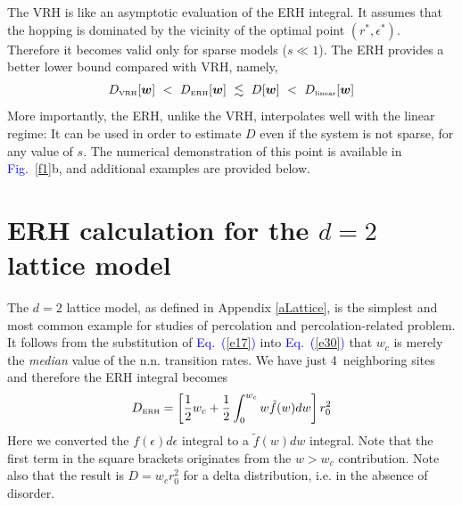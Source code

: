 \documentclass[aps,prb,floats,floatfix,twocolumn]{revtex4}
\newcommand{\eexp}{\mbox{e}^}
\newcommand{\tbox}[1]{\mbox{\tiny #1}}
\newcommand{\mylabel}[1]{\label{#1}}
\newcommand{\beq}{\begin{eqnarray}}
\newcommand{\eeq}{\end{eqnarray}}
\newcommand{\be}[1]{\begin{eqnarray}\ifthenelse{#1=-1}
{\nonumber}{\ifthenelse{#1=0}{}{\mylabel{e#1}}}}
\newcommand{\Eq}[1]{\textcolor{blue}{Eq.\!\!~(\ref{#1})}}
\newcommand{\Fig}[1]{\textcolor{blue}{Fig.}\!\!~\ref{#1}}
\newcommand{\hide}[1]{}
\begin{document}
The VRH is like an asymptotic evaluation of the ERH integral.
It assumes that the hopping is dominated 
by the vicinity of the optimal point ${(r^*,\epsilon^*)}$.
Therefore it becomes valid only for sparse models ($s\ll1$). 
The ERH provides a better lower bound compared with VRH, namely, 
%
\beq
D_{\tbox{VRH}}[\bm{w}]  
\ < \ D_{\tbox{ERH}}[\bm{w}]
\ \lesssim \ D[\bm{w}]
\ < \ D_{\tbox{linear}}[\bm{w}]
\eeq
%
More importantly, the ERH, unlike the VRH, 
interpolates well with the linear regime:  
It can be used in order to estimate $D$ 
even if the system is not sparse, for any value of $s$. 
The numerical demonstration of this point 
is available in \Fig{f1}b, and additional 
examples are provided below.  



\section{ERH calculation for the $d{=}2$ lattice model}

The $d{=}2$ lattice model, as defined in Appendix \ref{aLattice}, 
is the simplest and most common example 
for studies of percolation and percolation-related problem. 
%
It follows from the substitution of \Eq{e17} into \Eq{e30}
that $w_c$ is merely the {\em median} value of the n.n. transition rates. 
We have just 4~neighboring sites and therefore the ERH integral becomes
%
\be{37}
D_{\tbox{ERH}} =  \left[\frac{1}{2}w_c + \frac{1}{2}\int_0^{w_c} w\tilde{f}(w) dw\right]r_0^2
\eeq
% 
Here we converted the $f(\epsilon)d\epsilon$ integral 
to a $\tilde{f}(w)dw$ integral.     
Note that the first term in the square brackets 
originates from the ${w>w_c}$ contribution.
Note also that the result is $D= w_c r_0^2$ for a delta 
distribution, i.e. in the absence of disorder. 


\hide{
We would like to test the validity of \Eq{e37}.
The purpose of this test is twofold: 
(i) to verify that the use of ${n_c=2}$  
indeed leads to a good estimate; 
(ii) to see whether the ERH estimate is indeed 
an improvement over the conventional estimate. 
The conventional estimate is just to use 
the median value leading to $D \approx w_c r_0^2$. 
%
For the purpose of numerical test we consider 
a uniform distribution of $\epsilon$ 
within ${[-\sigma,\sigma]}$. From \Eq{e37} we get 
%
\beq
D_{\tbox{ERH}} =  \left[\frac{1}{2} + \frac{1}{2\sigma}\left(1-\eexp{-\sigma}\right)\right] 
\, w_c \, r_0^2
\eeq
%
This formula is tested in \Fig{f3}.
}
\end{document}
